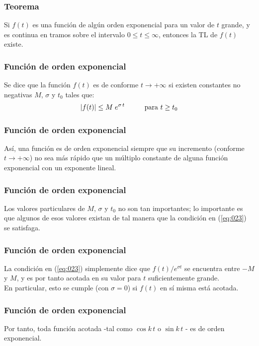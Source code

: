 \begin{frame}
\frametitle{Teorema}
Si $f (t)$ es una función de algún orden exponencial para un valor de $t$ grande, y es continua en tramos sobre el intervalo $0 \leq t \leq \infty$, entonces la TL de $f (t)$ existe.
\end{frame}
\begin{frame}
\frametitle{Función de orden exponencial}
Se dice que la función $f (t)$ es de  conforme $t \to + \infty$ si existen constantes no negativas $M$, $\sigma$ y $t_{0}$ tales que:
\pause
\begin{align}
\abs{f (t)} \leq M \; e^{\sigma \, t} \hspace{1cm} \mbox{para } t \geq t_{0}
\label{eq:023}
\end{align}
\end{frame}
\begin{frame}
\frametitle{Función de orden exponencial}
Así, una función es de orden exponencial siempre que su incremento (conforme $t \to + \infty$) no sea más rápido que un múltiplo constante de alguna función exponencial con un exponente lineal.
\end{frame}
\begin{frame}
\frametitle{Función de orden exponencial}
Los valores particulares de $M$, $\sigma$ y $t_{0}$ no son tan importantes; lo importante es que algunos de esos valores existan de tal manera que la condición en (\ref{eq:023}) se satisfaga.
\end{frame}
\begin{frame}
\frametitle{Función de orden exponencial}
La condición en (\ref{eq:023}) simplemente dice que $f (t) / e^{\sigma t}$ se encuentra entre $-M$ y $M$, y es por tanto acotada en su valor para $t$ suficientemente grande.
\\
\bigskip
\pause
En particular, esto se cumple (con $\sigma = 0$) si $f (t)$ en sí misma está acotada.
\end{frame}
\begin{frame}
\frametitle{Función de orden exponencial}
Por tanto, toda función acotada -tal como $\cos k \, t$ o $\sin k \, t$ - es de orden exponencial.
\end{frame}

